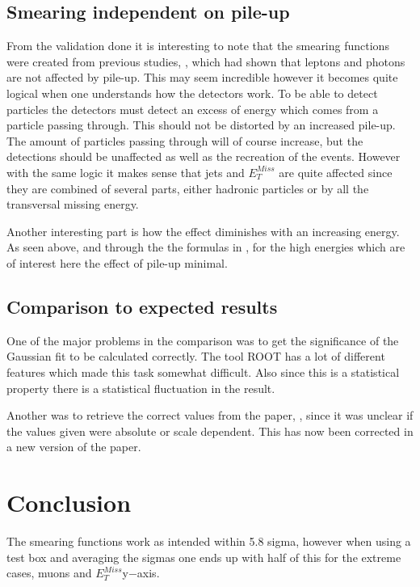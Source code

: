 \subsection{Smearing independent on pile-up}\label{chap:vali:sec:dis:subsec:smearindep}
From the validation done it is interesting to note that the smearing functions were created from previous studies, \citep{Electronperf:2011, ATLAS:LOI2}, which had shown that leptons and photons are not affected by pile-up.
This may seem incredible however it becomes quite logical when one understands how the detectors work. To be able to detect particles the detectors must detect an excess of energy which comes from a particle passing through. This should not be distorted by an increased pile-up. The amount of particles passing through will of course increase, but the detections should be unaffected as well as the recreation of the events. However with the same logic it makes sense that jets and $E_T^{Miss}$ are quite affected since they are combined of several parts, either hadronic particles or by all the transversal missing energy. 

Another interesting part is how the effect diminishes with an increasing energy. As seen above, and through the the formulas in , for the high energies which are of interest here the effect of pile-up minimal. 
\subsection{Comparison to expected results}
One of the major problems in the comparison was to get the significance of the Gaussian fit to be calculated correctly. The tool ROOT has a lot of different features which made this task somewhat difficult. Also since this is a statistical property there is a statistical fluctuation in the result. 

Another was to retrieve the correct values from the paper, \citep{ATL-PHYS-PUB-2013-004}, since it was unclear if the values given were absolute or scale dependent. This has now been corrected in a new version of the paper.
\newpage
\section{Conclusion}
The smearing functions work as intended within 5.8 sigma, however when using a test box and averaging the sigmas one ends up with half of this for the extreme cases, muons and $E_T^{Miss} $y$-$axis.